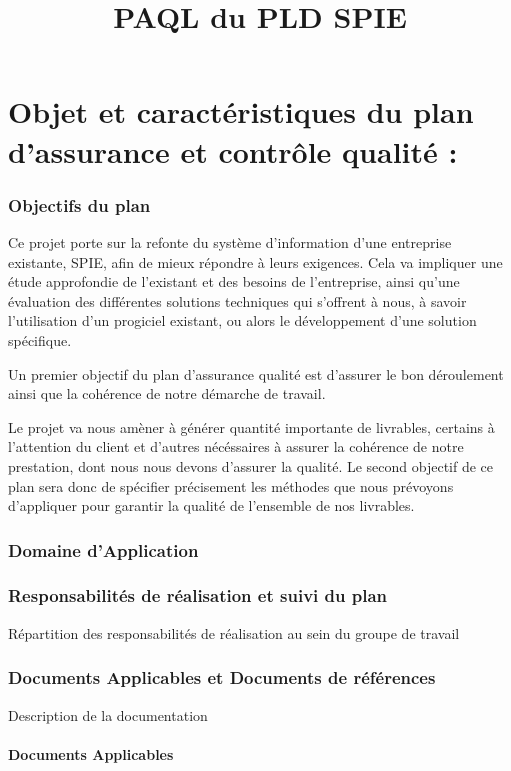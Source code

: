 \documentclass[a4paper, 18pt]{article}
\title{PAQL du PLD SPIE}
\begin{document}
\part{Objet et caractéristiques du plan d'assurance et contrôle qualité :}

\section{Objectifs du plan}

Ce projet porte sur la refonte du système d'information d'une entreprise existante, SPIE, afin de mieux répondre à leurs exigences. Cela va impliquer une étude approfondie de l'existant et des besoins de l'entreprise, ainsi qu'une évaluation des différentes solutions techniques qui s'offrent à nous, à savoir l'utilisation d'un progiciel existant, ou alors le développement d'une solution spécifique.

Un premier objectif du plan d'assurance qualité est d'assurer le bon déroulement ainsi que la cohérence de notre démarche de travail.

Le projet va nous amèner à générer quantité importante de livrables, certains à l'attention du client et d'autres nécéssaires à assurer la cohérence de notre prestation, dont nous nous devons d'assurer la qualité. Le second objectif de ce plan sera donc de spécifier précisement les méthodes que nous prévoyons d'appliquer pour garantir la qualité de l'ensemble de nos livrables.

\section{Domaine d'Application}



\section{Responsabilités de réalisation et suivi du plan}

Répartition des responsabilités de réalisation au sein du groupe de travail

\section{Documents Applicables et Documents de références }

Description de la documentation 

\subsection{Documents Applicables}
\end{document}

